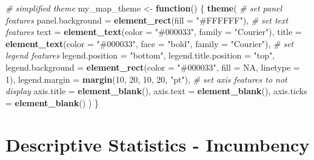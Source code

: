 \documentclass[
]{article}
\newenvironment{Shaded}{\begin{snugshade}}{\end{snugshade}}
\newcommand{\AttributeTok}[1]{\textcolor[rgb]{0.13,0.29,0.53}{#1}}
\newcommand{\CommentTok}[1]{\textcolor[rgb]{0.56,0.35,0.01}{\textit{#1}}}
\newcommand{\ConstantTok}[1]{\textcolor[rgb]{0.56,0.35,0.01}{#1}}
\newcommand{\ControlFlowTok}[1]{\textcolor[rgb]{0.13,0.29,0.53}{\textbf{#1}}}
\newcommand{\DecValTok}[1]{\textcolor[rgb]{0.00,0.00,0.81}{#1}}
\newcommand{\FunctionTok}[1]{\textcolor[rgb]{0.13,0.29,0.53}{\textbf{#1}}}
\newcommand{\NormalTok}[1]{#1}
\newcommand{\OtherTok}[1]{\textcolor[rgb]{0.56,0.35,0.01}{#1}}
\newcommand{\StringTok}[1]{\textcolor[rgb]{0.31,0.60,0.02}{#1}}
\begin{document}
\begin{Shaded}
\begin{Highlighting}[]
\CommentTok{\# simplified theme}
\NormalTok{my\_map\_theme }\OtherTok{\textless{}{-}} \ControlFlowTok{function}\NormalTok{() \{}
  \FunctionTok{theme}\NormalTok{(}
    \CommentTok{\# set panel features}
    \AttributeTok{panel.background =} \FunctionTok{element\_rect}\NormalTok{(}\AttributeTok{fill =} \StringTok{"\#FFFFFF"}\NormalTok{),}
    \CommentTok{\# set text features}
    \AttributeTok{text =} \FunctionTok{element\_text}\NormalTok{(}\AttributeTok{color =} \StringTok{"\#000033"}\NormalTok{, }\AttributeTok{family =} \StringTok{"Courier"}\NormalTok{),}
    \AttributeTok{title =} \FunctionTok{element\_text}\NormalTok{(}\AttributeTok{color =} \StringTok{"\#000033"}\NormalTok{, }\AttributeTok{face =} \StringTok{"bold"}\NormalTok{, }\AttributeTok{family =} \StringTok{"Courier"}\NormalTok{),}
    \CommentTok{\# set legend features}
    \AttributeTok{legend.position =} \StringTok{"bottom"}\NormalTok{,}
    \AttributeTok{legend.title.position =} \StringTok{"top"}\NormalTok{,}
    \AttributeTok{legend.background =} \FunctionTok{element\_rect}\NormalTok{(}\AttributeTok{color =} \StringTok{"\#000033"}\NormalTok{, }\AttributeTok{fill =} \ConstantTok{NA}\NormalTok{, }\AttributeTok{linetype =} \DecValTok{1}\NormalTok{),}
    \AttributeTok{legend.margin =} \FunctionTok{margin}\NormalTok{(}\DecValTok{10}\NormalTok{, }\DecValTok{20}\NormalTok{, }\DecValTok{10}\NormalTok{, }\DecValTok{20}\NormalTok{, }\StringTok{"pt"}\NormalTok{),}
    \CommentTok{\# set axis features to not display}
    \AttributeTok{axis.title =} \FunctionTok{element\_blank}\NormalTok{(),}
    \AttributeTok{axis.text =} \FunctionTok{element\_blank}\NormalTok{(),}
    \AttributeTok{axis.ticks =} \FunctionTok{element\_blank}\NormalTok{()}
\NormalTok{  )}
\NormalTok{\}}
\end{Highlighting}
\end{Shaded}

\section{Descriptive Statistics -
Incumbency}\label{descriptive-statistics---incumbency}
\end{document}
